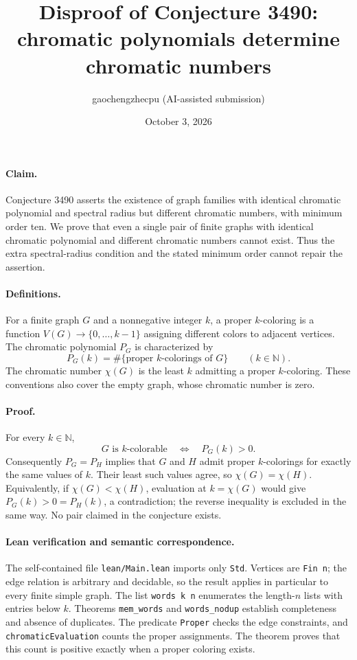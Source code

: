 \documentclass[10pt]{article}
\title{Disproof of Conjecture 3490: chromatic polynomials determine chromatic numbers}
\author{gaochengzhecpu (AI-assisted submission)}
\date{October 3, 2026}
\makeatletter
\renewcommand{\maketitle}{\begin{center}
{\Large\bfseries\@title\par}\vspace{0.6em}
{\small\@author\par\@date}
\end{center}\vspace{0.5em}}
\makeatother
\begin{document}
\maketitle

\paragraph{Claim.}
Conjecture 3490 asserts the existence of graph families with identical
chromatic polynomial and spectral radius but different chromatic
numbers, with minimum order ten. We prove that even a single pair of
finite graphs with identical chromatic polynomial and different
chromatic numbers cannot exist. Thus the extra spectral-radius
condition and the stated minimum order cannot repair the assertion.

\paragraph{Definitions.}
For a finite graph $G$ and a nonnegative integer $k$, a proper
$k$-coloring is a function $V(G)\to\{0,\ldots,k-1\}$ assigning
different colors to adjacent vertices. The chromatic polynomial $P_G$
is characterized by
\[
 P_G(k)=\#\{\text{proper $k$-colorings of }G\}
 \qquad(k\in\mathbb N).
\]
The chromatic number $\chi(G)$ is the least $k$ admitting a proper
$k$-coloring. These conventions also cover the empty graph, whose
chromatic number is zero.

\paragraph{Proof.}
For every $k\in\mathbb N$,
\[
 G\text{ is $k$-colorable}\quad\Longleftrightarrow\quad P_G(k)>0.
\]
Consequently $P_G=P_H$ implies that $G$ and $H$ admit proper
$k$-colorings for exactly the same values of $k$. Their least such
values agree, so $\chi(G)=\chi(H)$.
Equivalently, if $\chi(G)<\chi(H)$, evaluation at $k=\chi(G)$
would give $P_G(k)>0=P_H(k)$, a contradiction; the reverse inequality
is excluded in the same way. No pair claimed in the conjecture exists.

\paragraph{Lean verification and semantic correspondence.}
The self-contained file \texttt{lean/Main.lean} imports only \texttt{Std}.
Vertices are \texttt{Fin n}; the edge relation is arbitrary and
decidable, so the result applies in particular to every finite simple
graph. The list \texttt{words k n} enumerates the length-$n$ lists with
entries below $k$. Theorems \texttt{mem\_words} and
\texttt{words\_nodup} establish completeness and absence of
duplicates. The predicate \texttt{Proper} checks the edge constraints,
and \texttt{chromaticEvaluation} counts the proper assignments.
The theorem  proves that this
count is positive exactly when a proper coloring exists.
\end{document}
